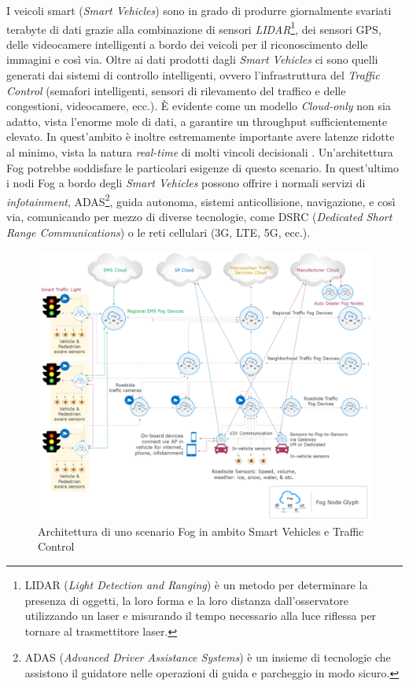 I veicoli smart (\textit{Smart Vehicles}) sono in grado di produrre giornalmente svariati terabyte di dati grazie alla combinazione di sensori \textit{LIDAR}\footnote{LIDAR (\textit{Light Detection and Ranging}) è un metodo per determinare la presenza di oggetti, la loro forma e la loro distanza dall'osservatore utilizzando un laser e misurando il tempo necessario alla luce riflessa per tornare al trasmettitore laser.}, dei sensori GPS, delle videocamere intelligenti a bordo dei veicoli per il riconoscimento delle immagini e così via. Oltre ai dati prodotti dagli \textit{Smart Vehicles} ci sono quelli generati dai sistemi di controllo intelligenti, ovvero l'infrastruttura del \textit{Traffic Control} (semafori intelligenti, sensori di rilevamento del traffico e delle congestioni, videocamere, ecc.). È evidente come un modello \textit{Cloud-only} non sia adatto, vista l'enorme mole di dati, a garantire un throughput sufficientemente elevato. In quest'ambito è inoltre estremamente importante avere latenze ridotte al minimo, vista la natura \textit{real-time} di molti vincoli decisionali \cite{RealTimeDecisionMakingSmartVehicles}. Un'architettura Fog potrebbe soddisfare le particolari esigenze di questo scenario. In quest'ultimo i nodi Fog a bordo degli \textit{Smart Vehicles} possono offrire i normali servizi di \textit{infotainment}, ADAS\footnote{ADAS (\textit{Advanced Driver Assistance Systems}) è un insieme di tecnologie che assistono il guidatore nelle operazioni di guida e parcheggio in modo sicuro.}, guida autonoma, sistemi anticollisione, navigazione, e così via, comunicando per mezzo di diverse tecnologie, come DSRC (\textit{Dedicated Short Range Communications}) o le reti cellulari (3G, LTE, 5G, ecc.).

\begin{figure}[!ht]
  \includegraphics[width=14cm]{images/smartcars_trafficcontrol}
  \centering
  \caption[Architettura di uno scenario Fog in ambito Smart Vehicles e Traffic Control]{Architettura di uno scenario Fog in ambito Smart Vehicles e Traffic Control \cite{OpenFogReferenceArchitecture}}
  \label{fig:smartcars_trafficcontrol}
\end{figure}

